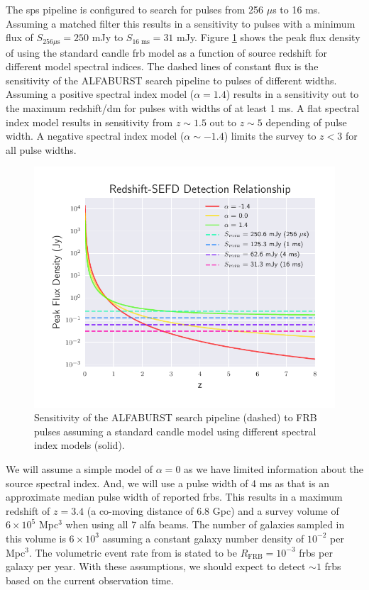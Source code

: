 \documentclass[a4paper,fleqn,usenatbib]{mnras}
\begin{document}
The \gls{sps} pipeline is configured to search for pulses from 256 $\mu$s to 16
ms. Assuming a matched filter this results in a sensitivity to pulses with a
minimum flux of $S_{256 \mu\textrm{s}} = 250$ mJy to $S_{16 \; \textrm{ms}} =
31$ mJy. Figure \ref{fig:fwhm_sefd_z} shows the peak flux density of using the
standard candle \gls{frb} model as a function of source redshift for different
model spectral indices. The dashed lines of constant flux is the sensitivity of
the ALFABURST search pipeline to pulses of different widths. Assuming a positive
spectral index model ($\alpha=1.4$) results in a sensitivity out to the maximum
redshift/\gls{dm} for pulses with widths of at least 1 ms. A flat spectral
index model results in sensitivity from $z \sim 1.5$ out to $z \sim 5$ depending
of pulse width. A negative spectral index model ($\alpha \sim -1.4$) limits the
survey to $z < 3$ for all pulse widths.

\begin{figure}
    \includegraphics[width=1.0\linewidth]{figures/fwhm_sefd_z_relation.pdf}
    \caption{Sensitivity of the ALFABURST search pipeline (dashed) to FRB pulses
    assuming a standard candle model using different spectral index models
    (solid).
    }
    \label{fig:fwhm_sefd_z}
\end{figure}

We will assume a simple model of $\alpha=0$ as we have limited information about
the source spectral index. And, we will use a pulse width of 4 ms as that is an
approximate median pulse width of reported \glspl{frb}. This results in a
maximum redshift of $z=3.4$ (a co-moving distance of 6.8 Gpc) and a survey
volume of $6 \times 10^5$ Mpc$^3$ when using all 7 \gls{alfa} beams. The
number of galaxies sampled in this volume is $6 \times 10^3$ assuming a constant
galaxy number density of $10^{-2}$ per Mpc$^3$.  The volumetric event rate from
\cite{2013Sci...341...53T} is stated to be $R_{\textrm{FRB}} = 10^{-3}$
\glspl{frb} per galaxy per year. With these assumptions, we should expect to
detect $\sim 1$ \glspl{frb} based on the current observation time.
\end{document}
